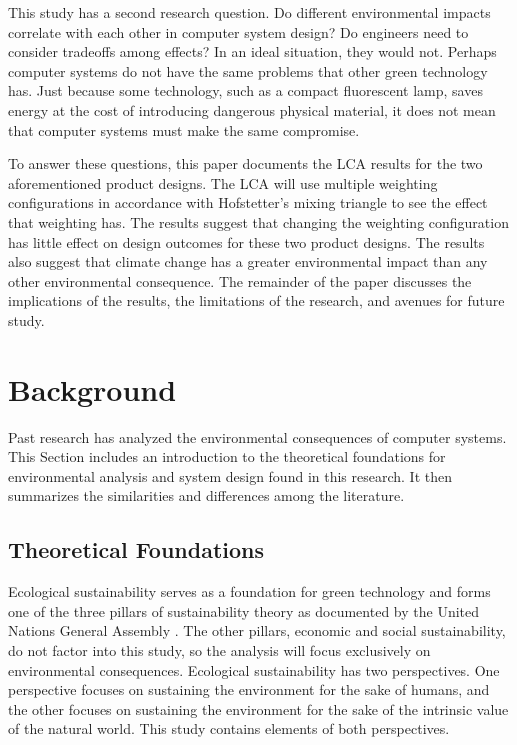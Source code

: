 \documentclass[final,journal,10pt,letterpaper,oneside,twocolumn,compsoc]%
{IEEEtran}
\begin{document}
This study has a second research question. Do different environmental impacts
correlate with each other in computer system
design? Do engineers need to consider tradeoffs among effects? In an ideal
situation, they would not. Perhaps computer systems do not have the same
problems that other green technology has. Just because some technology, such as
a compact fluorescent lamp, saves energy at the cost of introducing dangerous
physical material, it
does not mean that computer systems must make the same compromise.

To answer these questions, this paper documents the LCA results for the two
aforementioned product designs. The LCA will use multiple weighting
configurations in accordance with Hofstetter's mixing triangle to see the effect
that weighting has. The results suggest that changing the weighting
configuration has little effect on design outcomes for these two product
designs. The
results also suggest that climate change has a greater environmental impact than
any other environmental consequence. The remainder of the paper discusses the
implications of the results, the limitations of the research, and avenues for
future study.

\section{Background}
Past research has analyzed the
environmental consequences of computer systems. This
Section includes an
introduction to the theoretical foundations for environmental analysis and
system design found in this research. It then summarizes the similarities and
differences among the literature.

\subsection{Theoretical Foundations}
Ecological sustainability serves as a foundation for green technology and
forms one of the three pillars of sustainability theory as documented by the
United Nations General Assembly
\cite{un}. The other pillars, economic and social sustainability, do not factor
into this study, so the analysis will focus exclusively on environmental
consequences. Ecological sustainability has two perspectives. One perspective
focuses on sustaining the environment for the sake of humans, and the other
focuses on sustaining the environment for the sake of the intrinsic value of the
natural world. This study contains elements of both perspectives.
\end{document}
